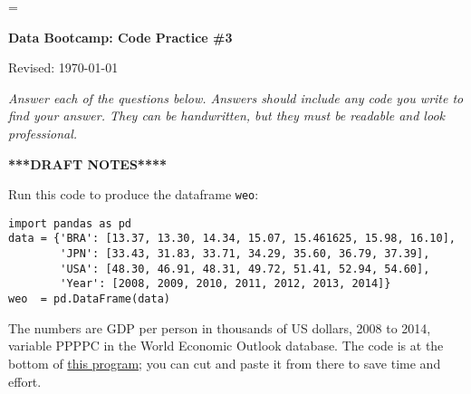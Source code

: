\documentclass[11pt]{exam}
\begin{document}
\parskip=\bigskipamount
\parindent=0.0in
\thispagestyle{empty}


\bigskip\bigskip
\centerline{\Large \bf Data Bootcamp:  Code Practice \#3}
\centerline{Revised: \today}

{\it Answer each of the questions below.
Answers should include any code you write to find your answer.
They can be handwritten, but they must be readable and look professional.}

\bigskip 
\centerline{\bf ****DRAFT NOTES****}


Run this code to produce the dataframe \texttt{weo}:
\vspace{-0.15in}
\begin{verbatim}
import pandas as pd
data = {'BRA': [13.37, 13.30, 14.34, 15.07, 15.461625, 15.98, 16.10],
        'JPN': [33.43, 31.83, 33.71, 34.29, 35.60, 36.79, 37.39],
        'USA': [48.30, 46.91, 48.31, 49.72, 51.41, 52.94, 54.60],
        'Year': [2008, 2009, 2010, 2011, 2012, 2013, 2014]}
weo  = pd.DataFrame(data)
\end{verbatim}
\vspace{-0.15in}
The numbers are GDP per person in thousands of US dollars, 2008 to 2014,
variable PPPPC in the World Economic Outlook database.
The code is at the bottom of
\href{https://github.com/DaveBackus/Data_Bootcamp/blob/master/Code/Python/bootcamp_pandas_1.py}
{this program};
you can cut and paste it from there to save time and effort.
\end{document}
